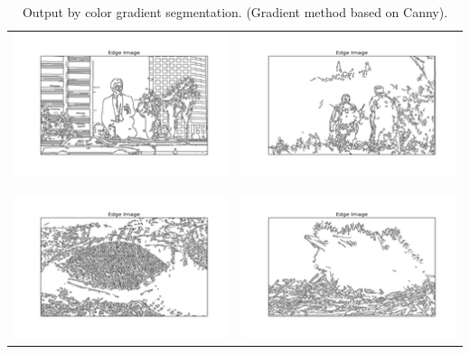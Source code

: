 \documentclass{article}
\begin{document}
\begin{center}
\begin{table}
\begin{tabular}{c| c}
\includegraphics[scale = 0.7]{canny_1} & \includegraphics[scale = 0.7]{canny_2}\\
\\\hline\\
\includegraphics[scale = 0.7]{canny_3} & \includegraphics[scale = 0.7]{canny_4}\\
\end{tabular}
\caption{Output by color gradient segmentation. (Gradient method based on Canny).}
\label{table:3}
\end{table}
\end{center}
\end{document}
